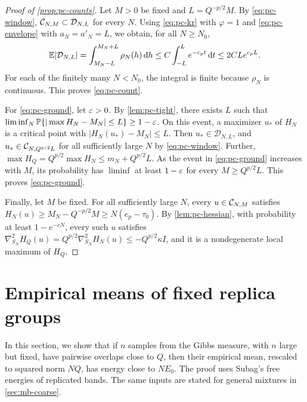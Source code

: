 \begin{proof}[Proof of \cref{prop:pc-counts}]
Let $M>0$ be fixed and $L=Q^{-p/2}M$. By \eqref{eq:pc-window}, $\mathcal C_{N,M}\subset\mathcal D_{N,L}$ for every $N$. Using \eqref{eq:pc-kr} with $\varphi=1$ and \eqref{eq:pc-envelope} with $a_N=a'_N=L$, we obtain, for all $N\ge N_0$,
\[
\mathbb E|\mathcal D_{N,L}|=\int_{M_N-L}^{M_N+L}\rho_N(h)\,\mathrm d h\le C\int_{-L}^Le^{-c_pt}\,\mathrm d t\le2CLe^{c_pL}.
\]
For each of the finitely many $N<N_0$, the integral is finite because $\rho_N$ is continuous. This proves \eqref{eq:pc-count}.

For \eqref{eq:pc-ground}, let $\varepsilon>0$. By \cref{lem:pc-tight}, there exists $L$ such that $\liminf_N\mathbb P\{|\max H_N-M_N|\le L\}\ge1-\varepsilon$. On this event, a maximizer $u_*$ of $H_N$ is a critical point with $|H_N(u_*)-M_N|\le L$. Then $u_*\in\mathcal D_{N,L}$, and $u_*\in\mathcal C_{N,Q^{p/2}L}$ for all sufficiently large $N$ by \eqref{eq:pc-window}. Further, $\max H_Q=Q^{p/2}\max H_N\le m_N+Q^{p/2}L$. As the event in \eqref{eq:pc-ground} increases with $M$, its probability has $\liminf$ at least $1-\varepsilon$ for every $M\ge Q^{p/2}L$. This proves \eqref{eq:pc-ground}.

Finally, let $M$ be fixed. For all sufficiently large $N$, every $u\in\mathcal C_{N,M}$ satisfies $H_N(u)\ge M_N-Q^{-p/2}M\ge N(e_p-\tau_0)$. By \cref{lem:pc-hessian}, with probability at least $1-e^{-cN}$, every such $u$ satisfies $\nabla^2_{S_N}H_Q(u)=Q^{p/2}\nabla^2_{S_N}H_N(u)\le-Q^{p/2}\kappa I$, and it is a nondegenerate local maximum of $H_Q$.
\end{proof}

\section{Empirical means of fixed replica groups}\label{sec:pc-replicas}

In this section, we show that if $n$ samples from the Gibbs measure, with $n$ large but fixed, have pairwise overlaps close to $Q$, then their empirical mean, rescaled to squared norm $NQ$, has energy close to $NE_0$. The proof uses Subag's free energies of replicated bands. The same inputs are stated for general mixtures in \cref{sec:mb-coarse}.

